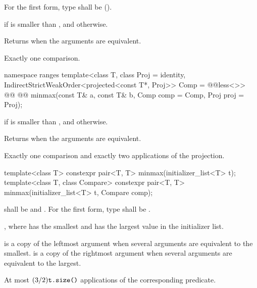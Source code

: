 \begin{itemdescr}
\pnum
\requires
For the first form, type  shall be
 ().

\pnum
\returns
{} if  is smaller
than , and
 otherwise.

\pnum
\remarks
Returns  when the arguments are equivalent.

\pnum
\complexity
Exactly one comparison.
\end{itemdescr}

\begin{addedblock}
%
\begin{itemdecl}
namespace ranges {
  template<class T, class Proj = identity,
      IndirectStrictWeakOrder<projected<const T*, Proj>> Comp = @@less<>>
    @@
    @@
      minmax(const T& a, const T& b, Comp comp = Comp{}, Proj proj = Proj{});
}
\end{itemdecl}

\begin{itemdescr}
\pnum
\returns
{} if  is smaller
than , and
 otherwise.

\pnum
\remarks
Returns  when the arguments are equivalent.

\pnum
\complexity
Exactly one comparison and exactly two applications of the projection.
\end{itemdescr}
\end{addedblock}

%
\begin{itemdecl}
template<class T>
  constexpr pair<T, T> minmax(initializer_list<T> t);
template<class T, class Compare>
  constexpr pair<T, T> minmax(initializer_list<T> t, Compare comp);
\end{itemdecl}

\begin{itemdescr}
\pnum
\requires {} shall be  and .
For the first form, type  shall be .

\pnum
\returns {}, where  has the smallest and  has the
largest value in the initializer list.

\pnum
\remarks {} is a copy of the leftmost argument when several arguments are equivalent to
the smallest.  is a copy of the rightmost argument when several arguments are
equivalent to the largest.

\pnum
\complexity At most $(3/2)\texttt{t.size()}$ applications of the corresponding predicate.
\end{itemdescr}

